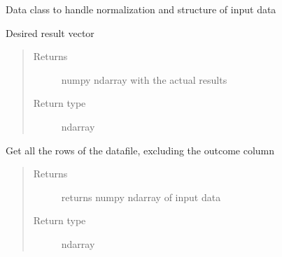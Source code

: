 \documentclass[letterpaper,10pt,english]{sphinxmanual}
\begin{document}
\begin{fulllineitems}
\label{\detokenize{index:Coursework.data.Data}}
Data class to handle normalization and structure of input data

\begin{fulllineitems}
\label{\detokenize{index:Coursework.data.Data.get_output}}
Desired result vector
\begin{quote}\begin{description}
\item[{Returns}] \leavevmode
numpy ndarray with the actual results

\item[{Return type}] \leavevmode
ndarray

\end{description}\end{quote}

\end{fulllineitems}


\begin{fulllineitems}
\label{\detokenize{index:Coursework.data.Data.get_rows}}
Get all the rows of the datafile, excluding the outcome column
\begin{quote}\begin{description}
\item[{Returns}] \leavevmode
returns numpy ndarray of input data

\item[{Return type}] \leavevmode
ndarray

\end{description}\end{quote}

\end{fulllineitems}


\end{fulllineitems}
\end{document}
